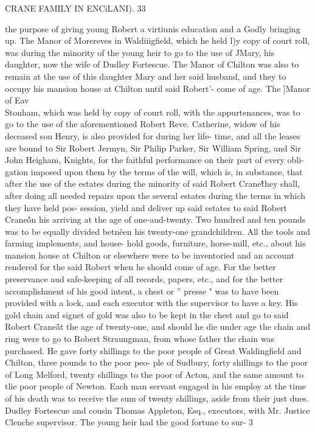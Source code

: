 \documentclass{book}
\begin{document}
CRANE FAMILY IN ENCiLANI). 33 

the purpose of giving young Robert a virtiunis education and a 
Godly bringing up. The Manor of Morereves in Waldiiigfield, 
which he held l)y copy of court roll, was during the minority of 
the young heir to go to the use of JMary, his daughter, now the 
wife of Dudley Fortescue. The Manor of Chilton was also to 
remain at the use of this daughter Mary and her said husband, 
and they to occupy his mansion house at Chilton until said 
Robert'- come of age. The ]Manor of Eav\\ Stonham, which 
was held by copy of court roll, with the appurtenances, was to go 
to the use of the aforementioned Robert Reve. Catherine, widow 
of his deceased sou Henry, is also provided for during her life- 
time, and all the leases are bound to Sir Robert Jermyn, Sir 
Philip Parker, Sir William Spring, and Sir John Heigham, 
Knights, for the faithful performance on their part of every obli- 
gation imposed upon them by the terms of the will, which is, in 
substance, that after the use of the estates during the minority of 
said Robert Crane\^\^ they shall, after doing all needed repairs upon 
the several estates during the terms in which they have held pos- 
session, yield and deliver up said estates to said Robert Crane\^\^ 
on his arriving at the age of one-aud-twenty. Two hundred and 
ten pounds was to be equally divided betn\^een his twenty-one 
grandchildren. All the tools and farming implements, and house- 
hold goods, furniture, horse-mill, etc., about his mansion house 
at Chilton or elsewhere were to be inventoried and an account 
rendered for the said Robert when he should come of age. For 
the better preservance aud safe-keeping of all records, papers, etc., 
and for the better accomplishment of his good intent, a chest or 
'' presse " was to have been provided with a lock, and each executor 
with the supervisor to have a key. His gold chain and signet of 
gold was also to be kept in the chest and go to said Robert Crane\^\^ 
at the age of twenty-one, and should he die under age the chain 
and ring were to go to Robert Straungman, from whose father the 
chain was purchased. He gave forty shillings to the poor people 
of Great Waldingfield and Chilton, three pounds to the poor peo- 
ple of Sudbury, forty shillings to the poor of Long Melford, 
twenty shillings to the poor of Acton, and the same amount to 
tlie poor people of Newton. Each man servant engaged in his 
employ at the time of his death was to receive the sum of twenty 
shillings, aside from their just dues. Dudley Fortescue and 
cousin Thomas Appleton, Esq., executors, with Mr. Justice 
Clenche supervisor. The young heir had the good fortune to sur- 
3 
\end{document}
